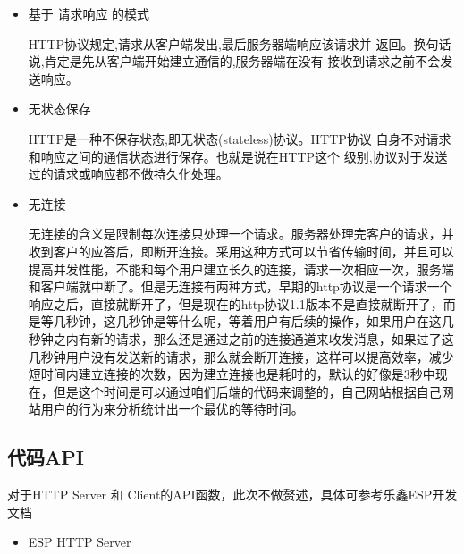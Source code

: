 \documentclass[a4paper,12pt,english]{sphinxmanual}
\begin{document}
{{\sphinxAtStartPar
{}
\begin{itemize}
\item {} 
\sphinxAtStartPar
基于 请求\sphinxhyphen{}响应 的模式

\sphinxAtStartPar
HTTP协议规定,请求从客户端发出,最后服务器端响应该请求并 返回。换句话说,肯定是先从客户端开始建立通信的,服务器端在没有 接收到请求之前不会发送响应。

\end{itemize}

\sphinxAtStartPar
{}
\begin{itemize}
\item {} 
\sphinxAtStartPar
无状态保存

\sphinxAtStartPar
HTTP是一种不保存状态,即无状态(stateless)协议。HTTP协议 自身不对请求和响应之间的通信状态进行保存。也就是说在HTTP这个 级别,协议对于发送过的请求或响应都不做持久化处理。

\end{itemize}

\sphinxAtStartPar
{}
\begin{itemize}
\item {} 
\sphinxAtStartPar
无连接

\sphinxAtStartPar
无连接的含义是限制每次连接只处理一个请求。服务器处理完客户的请求，并收到客户的应答后，即断开连接。采用这种方式可以节省传输时间，并且可以提高并发性能，不能和每个用户建立长久的连接，请求一次相应一次，服务端和客户端就中断了。但是无连接有两种方式，早期的http协议是一个请求一个响应之后，直接就断开了，但是现在的http协议1.1版本不是直接就断开了，而是等几秒钟，这几秒钟是等什么呢，等着用户有后续的操作，如果用户在这几秒钟之内有新的请求，那么还是通过之前的连接通道来收发消息，如果过了这几秒钟用户没有发送新的请求，那么就会断开连接，这样可以提高效率，减少短时间内建立连接的次数，因为建立连接也是耗时的，默认的好像是3秒中现在，但是这个时间是可以通过咱们后端的代码来调整的，自己网站根据自己网站用户的行为来分析统计出一个最优的等待时间。

\end{itemize}


\subsection{代码API}
\label{\detokenize{exp-esp32/http:api}}
\sphinxAtStartPar
对于HTTP Server 和 Client的API函数，此次不做赘述，具体可参考乐鑫ESP开发文档
\begin{itemize}
\item {} 
\sphinxAtStartPar
ESP HTTP Server


\end{itemize}}}
\end{document}

